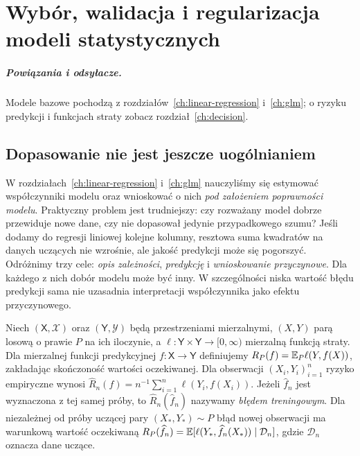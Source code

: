\chapter{Wybór, walidacja i regularizacja modeli statystycznych}
\label{ch:model-selection}
\paragraph{Powiązania i odsyłacze.} Modele bazowe pochodzą z rozdziałów~\ref{ch:linear-regression} i~\ref{ch:glm}; o ryzyku predykcji i funkcjach straty zobacz rozdział~\ref{ch:decision}.


\section{Dopasowanie nie jest jeszcze uogólnianiem}
W rozdziałach~\ref{ch:linear-regression} i~\ref{ch:glm} nauczyliśmy się
estymować współczynniki modelu oraz wnioskować o nich \emph{pod założeniem
poprawności modelu}. Praktyczny problem jest trudniejszy: czy rozważany
model dobrze przewiduje nowe dane, czy nie dopasował jedynie przypadkowego
szumu? Jeśli dodamy do regresji liniowej kolejne kolumny, resztowa suma
kwadratów na danych uczących nie wzrośnie, ale jakość predykcji może się
pogorszyć. Odróżnimy trzy cele: \emph{opis zależności}, \emph{predykcję}
i \emph{wnioskowanie przyczynowe}. Dla każdego z nich dobór modelu może być
inny. W szczególności niska wartość błędu predykcji sama nie uzasadnia
interpretacji współczynnika jako efektu przyczynowego.

\begin{definicja}
\label{def:predictive-risk}
Niech $(\mathsf X,\mathcal X)$ oraz $(\mathsf Y,\mathcal Y)$
będą przestrzeniami mierzalnymi, $(X,Y)$ parą losową
o prawie $P$ na ich iloczynie, a
$\ell:\mathsf Y\times\mathsf Y\to[0,\infty)$ mierzalną funkcją
straty. Dla mierzalnej funkcji predykcyjnej
$f:\mathsf X\to\mathsf Y$ definiujemy
$R_P(f)=\mathbb E_P\ell(Y,f(X))$, zakładając skończoność wartości oczekiwanej.
Dla obserwacji $(X_i,Y_i)_{i=1}^n$ ryzyko empiryczne wynosi
$\widehat R_n(f)=n^{-1}\sum_{i=1}^n\ell(Y_i,f(X_i))$.
Jeżeli $\widehat f_n$ jest wyznaczona z tej samej próby, to
$\widehat R_n(\widehat f_n)$ nazywamy \emph{błędem treningowym}.
Dla niezależnej od próby uczącej pary $(X_*,Y_*)\sim P$ błąd
nowej obserwacji ma warunkową wartość oczekiwaną
$R_P(\widehat f_n)=\mathbb E[\ell(Y_*,\widehat f_n(X_*))\mid\mathcal D_n]$,
gdzie $\mathcal D_n$ oznacza dane uczące.
\end{definicja}

